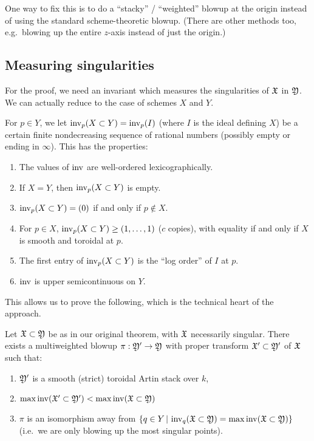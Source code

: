 \documentclass{amsart}
\begin{document}
One way to fix this is to do a ``stacky'' / ``weighted'' blowup at the origin instead of using the standard scheme-theoretic blowup.
(There are other methods too, e.g.\ blowing up the entire $z$-axis instead of just the origin.)

\subsection{Measuring singularities}

For the proof, we need an invariant which measures the singularities of $\mathfrak{X}$ in $\mathfrak{Y}$.
We can actually reduce to the case of schemes $X$ and $Y$.

For $p \in Y$, we let $\operatorname{inv}_p(X \subset Y) = \operatorname{inv}_p(I)$ (where $I$ is the ideal defining $X$) be a certain finite nondecreasing sequence of rational numbers (possibly empty or ending in $\infty$).
This has the properties:
\begin{enumerate}
	\item The values of $\operatorname{inv}$ are well-ordered lexicographically.
	\item If $X = Y$, then $\operatorname{inv}_p(X \subset Y)$ is empty.
	\item $\operatorname{inv}_p(X \subset Y) = (0)$ if and only if $p \not\in X$.
	\item For $p \in X$, $\operatorname{inv}_p(X \subset Y) \geq (1, \dots, 1)$ ($c$ copies), with equality if and only if $X$ is smooth and toroidal at $p$.
	\item The first entry of $\operatorname{inv}_p(X \subset Y)$ is the ``log order'' of $I$ at $p$.
	\item $\operatorname{inv}$ is upper semicontinuous on $Y$.
\end{enumerate}

This allows us to prove the following, which is the technical heart of the approach.

\begin{thm}
	Let $\mathfrak{X} \subset \mathfrak{Y}$ be as in our original theorem, with $\mathfrak{X}$ necessarily singular.
	There exists a multiweighted blowup $\pi: \mathfrak{Y}' \to \mathfrak{Y}$ with proper transform $\mathfrak{X}' \subset \mathfrak{Y}'$ of $\mathfrak{X}$ such that:
	\begin{enumerate}[label=(\roman*)]
		\item $\mathfrak{Y}'$ is a smooth (strict) toroidal Artin stack over $k$,
		\item $\max \operatorname{inv} (\mathfrak{X}' \subset \mathfrak{Y}') < \max \operatorname{inv} (\mathfrak{X} \subset \mathfrak{Y})$
		\item $\pi$ is an isomorphism away from $\{ q \in Y \,|\, \operatorname{inv}_q(\mathfrak{X} \subset \mathfrak{Y}) = \max \operatorname{inv}(\mathfrak{X} \subset \mathfrak{Y}) \}$ (i.e.\ we are only blowing up the most singular points).
	\end{enumerate}
\end{thm}
\end{document}
